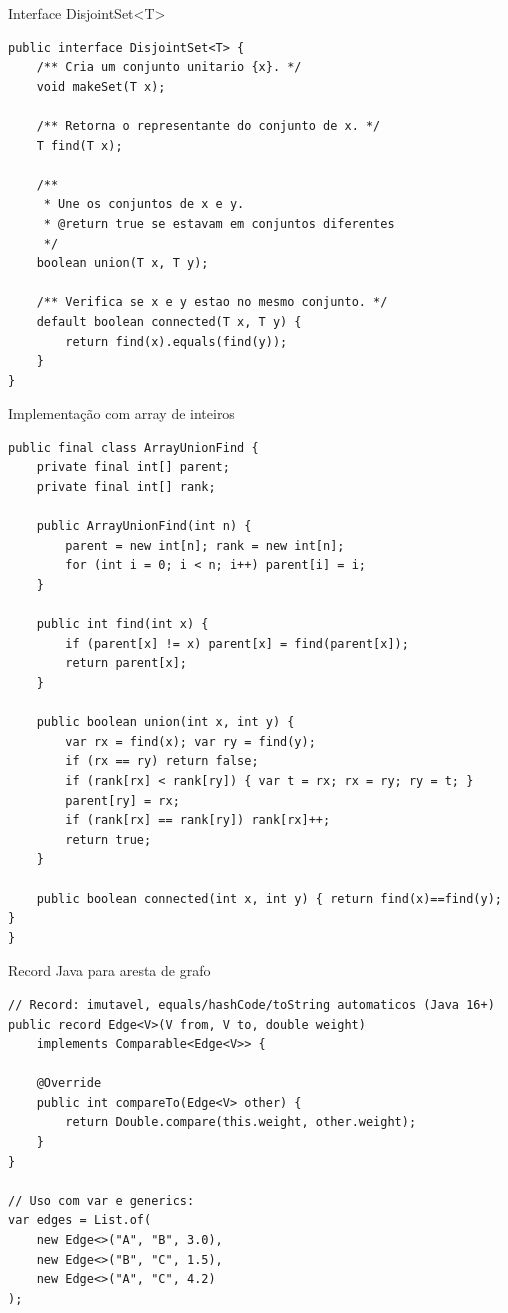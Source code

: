 \documentclass[aspectratio=169]{beamer}
\begin{document}
\begin{frame}[fragile,shrink=8]{Interface DisjointSet\textless T\textgreater{}}%
\begin{lstlisting}
public interface DisjointSet<T> {
    /** Cria um conjunto unitario {x}. */
    void makeSet(T x);

    /** Retorna o representante do conjunto de x. */
    T find(T x);

    /**
     * Une os conjuntos de x e y.
     * @return true se estavam em conjuntos diferentes
     */
    boolean union(T x, T y);

    /** Verifica se x e y estao no mesmo conjunto. */
    default boolean connected(T x, T y) {
        return find(x).equals(find(y));
    }
}
\end{lstlisting}
\end{frame}

\begin{frame}[fragile,shrink=30]{Implementação com array de inteiros}%
\begin{lstlisting}
public final class ArrayUnionFind {
    private final int[] parent;
    private final int[] rank;

    public ArrayUnionFind(int n) {
        parent = new int[n]; rank = new int[n];
        for (int i = 0; i < n; i++) parent[i] = i;
    }

    public int find(int x) {
        if (parent[x] != x) parent[x] = find(parent[x]);
        return parent[x];
    }

    public boolean union(int x, int y) {
        var rx = find(x); var ry = find(y);
        if (rx == ry) return false;
        if (rank[rx] < rank[ry]) { var t = rx; rx = ry; ry = t; }
        parent[ry] = rx;
        if (rank[rx] == rank[ry]) rank[rx]++;
        return true;
    }

    public boolean connected(int x, int y) { return find(x)==find(y); }
}
\end{lstlisting}
\end{frame}

\begin{frame}[fragile]{Record Java para aresta de grafo}%
\begin{lstlisting}
// Record: imutavel, equals/hashCode/toString automaticos (Java 16+)
public record Edge<V>(V from, V to, double weight)
    implements Comparable<Edge<V>> {

    @Override
    public int compareTo(Edge<V> other) {
        return Double.compare(this.weight, other.weight);
    }
}

// Uso com var e generics:
var edges = List.of(
    new Edge<>("A", "B", 3.0),
    new Edge<>("B", "C", 1.5),
    new Edge<>("A", "C", 4.2)
);
\end{lstlisting}
\end{frame}
\end{document}
